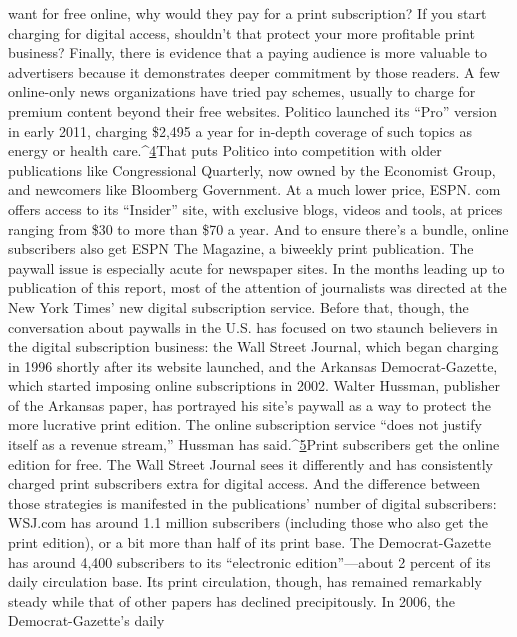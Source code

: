 want for free online, why would they pay for a print subscription? If you start
charging for digital access, shouldn't that protect your more profitable print business?
Finally, there is evidence that a paying audience is more valuable to advertisers
because it demonstrates deeper commitment by those readers.
A few online-only news organizations have tried pay schemes, usually to
charge for premium content beyond their free websites. Politico launched its
``Pro'' version in early 2011, charging \$2,495 a year for in-depth coverage of such
topics as energy or health care.^{\href{#endnotes-chapter-5}{4}}That puts Politico into competition with older
publications like Congressional Quarterly, now owned by the Economist Group,
and newcomers like Bloomberg Government. At a much lower price, ESPN.
com offers access to its ``Insider'' site, with exclusive blogs, videos and tools, at
prices ranging from \$30 to more than \$70 a year. And to ensure there's a bundle,
online subscribers also get ESPN The Magazine, a biweekly print publication.
The paywall issue is especially acute for newspaper sites. In the months leading
up to publication of this report, most of the attention of journalists was directed
at the New York Times' new digital subscription service. Before that, though, the
conversation about paywalls in the U.S. has focused on two staunch believers in
the digital subscription business: the Wall Street Journal, which began charging
in 1996 shortly after its website launched, and the Arkansas Democrat-Gazette,
which started imposing online subscriptions in 2002.
Walter Hussman, publisher of the Arkansas paper, has portrayed his site's paywall
as a way to protect the more lucrative print edition. The online subscription
service ``does not justify itself as a revenue stream,'' Hussman has said.^{\href{#endnotes-chapter-5}{5}}Print subscribers
get the online edition for free.
The Wall Street Journal sees it differently and has consistently charged print
subscribers extra for digital access. And the difference between those strategies
is manifested in the publications' number of digital subscribers: WSJ.com has
around 1.1 million subscribers (including those who also get the print edition),
or a bit more than half of its print base. The Democrat-Gazette has around 4,400
subscribers to its ``electronic edition''—about 2 percent of its daily circulation
base. Its print circulation, though, has remained remarkably steady while that of
other papers has declined precipitously. In 2006, the Democrat-Gazette's daily
